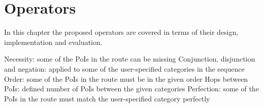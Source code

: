 \chapter{Operators} 
\label{sec:operators}

In this chapter the proposed operators are covered in terms of their design, implementation and evaluation.\newline

Necessity: some of the PoIs in the route can be missing\newline
Conjunction, disjunction and negation: applied to some of the user-specified categories in the sequence\newline
Order: some of the PoIs in the route must be in the given order\newline
Hops between PoIs: defined number of PoIs between the given categories\newline
Perfection:  some of the PoIs in the route must match the user-specified category perfectly\newline

